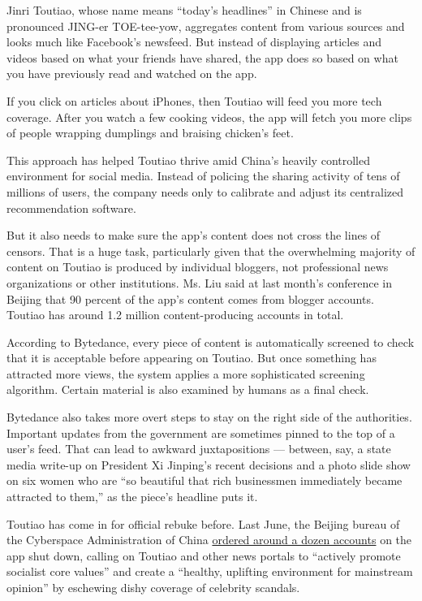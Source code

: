 Jinri Toutiao, whose name means ``today's headlines'' in Chinese and is
pronounced JING-er TOE-tee-yow, aggregates content from various sources
and looks much like Facebook's newsfeed. But instead of displaying
articles and videos based on what your friends have shared, the app does
so based on what you have previously read and watched on the app.

If you click on articles about iPhones, then Toutiao will feed you more
tech coverage. After you watch a few cooking videos, the app will fetch
you more clips of people wrapping dumplings and braising chicken's feet.

This approach has helped Toutiao thrive amid China's heavily controlled
environment for social media. Instead of policing the sharing activity
of tens of millions of users, the company needs only to calibrate and
adjust its centralized recommendation software.

But it also needs to make sure the app's content does not cross the
lines of censors. That is a huge task, particularly given that the
overwhelming majority of content on Toutiao is produced by individual
bloggers, not professional news organizations or other institutions. Ms.
Liu said at last month's conference in Beijing that 90 percent of the
app's content comes from blogger accounts. Toutiao has around 1.2
million content-producing accounts in total.

According to Bytedance, every piece of content is automatically screened
to check that it is acceptable before appearing on Toutiao. But once
something has attracted more views, the system applies a more
sophisticated screening algorithm. Certain material is also examined by
humans as a final check.

Bytedance also takes more overt steps to stay on the right side of the
authorities. Important updates from the government are sometimes pinned
to the top of a user's feed. That can lead to awkward juxtapositions ---
between, say, a state media write-up on President Xi Jinping's recent
decisions and a photo slide show on six women who are ``so beautiful
that rich businessmen immediately became attracted to them,'' as the
piece's headline puts it.

Toutiao has come in for official rebuke before. Last June, the Beijing
bureau of the Cyberspace Administration of China
\href{http://news.xinhuanet.com/politics/2017-06/07/c_1121104271.htm}{ordered
around a dozen accounts} on the app shut down, calling on Toutiao and
other news portals to ``actively promote socialist core values'' and
create a ``healthy, uplifting environment for mainstream opinion'' by
eschewing dishy coverage of celebrity scandals.

